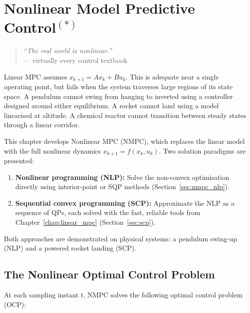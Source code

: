 \chapter{Nonlinear Model Predictive Control\texorpdfstring{$^{(*)}$}{(*)}}
\label{chap:nmpc}

\begin{quote}
	\textit{``The real world is nonlinear.''} \\
	\hfill --- virtually every control textbook
\end{quote}

Linear MPC assumes $x_{k+1} = Ax_k + Bu_k$. This is adequate near a single operating point, but fails when the system traverses large regions of its state space. A pendulum cannot swing from hanging to inverted using a controller designed around either equilibrium. A rocket cannot land using a model linearised at altitude. A chemical reactor cannot transition between steady states through a linear corridor.

This chapter develops Nonlinear MPC (NMPC), which replaces the linear model with the full nonlinear dynamics $x_{k+1} = f(x_k, u_k)$. Two solution paradigms are presented:
\begin{enumerate}[nosep]
	\item \textbf{Nonlinear programming (NLP):} Solve the non-convex optimisation directly using interior-point or SQP methods (Section~\ref{sec:nmpc_nlp}).
	\item \textbf{Sequential convex programming (SCP):} Approximate the NLP as a sequence of QPs, each solved with the fast, reliable tools from Chapter~\ref{chap:linear_mpc} (Section~\ref{sec:scp}).
\end{enumerate}
Both approaches are demonstrated on physical systems: a pendulum swing-up (NLP) and a powered rocket landing (SCP).


\section{The Nonlinear Optimal Control Problem}
\label{sec:nmpc_ocp}

At each sampling instant $t$, NMPC solves the following optimal control problem (OCP):

